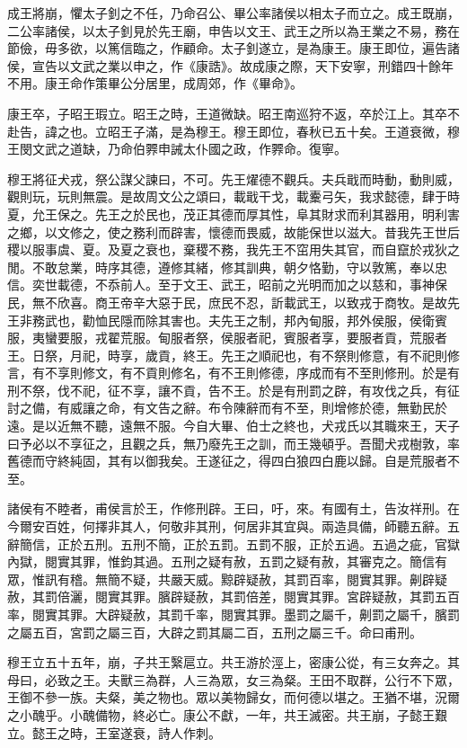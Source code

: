 成王將崩，懼太子釗之不任，乃命召公、畢公率諸侯以相太子而立之。成王既崩，二公率諸侯，以太子釗見於先王廟，申告以文王、武王之所以為王業之不易，務在節儉，毋多欲，以篤信臨之，作顧命。太子釗遂立，是為康王。康王即位，遍告諸侯，宣告以文武之業以申之，作《康誥》。故成康之際，天下安寧，刑錯四十餘年不用。康王命作策畢公分居里，成周郊，作《畢命》。

康王卒，子昭王瑕立。昭王之時，王道微缺。昭王南巡狩不返，卒於江上。其卒不赴告，諱之也。立昭王子滿，是為穆王。穆王即位，春秋已五十矣。王道衰微，穆王閔文武之道缺，乃命伯臩申誡太仆國之政，作臩命。復寧。

穆王將征犬戎，祭公謀父諫曰，不可。先王燿德不觀兵。夫兵戢而時動，動則威，觀則玩，玩則無震。是故周文公之頌曰，載戢干戈，載櫜弓矢，我求懿德，肆于時夏，允王保之。先王之於民也，茂正其德而厚其性，阜其財求而利其器用，明利害之鄉，以文修之，使之務利而辟害，懷德而畏威，故能保世以滋大。昔我先王世后稷以服事虞、夏。及夏之衰也，棄稷不務，我先王不窋用失其官，而自竄於戎狄之閒。不敢怠業，時序其德，遵修其緒，修其訓典，朝夕恪勤，守以敦篤，奉以忠信。奕世載德，不忝前人。至于文王、武王，昭前之光明而加之以慈和，事神保民，無不欣喜。商王帝辛大惡于民，庶民不忍，訢載武王，以致戎于商牧。是故先王非務武也，勸恤民隱而除其害也。夫先王之制，邦內甸服，邦外侯服，侯衛賓服，夷蠻要服，戎翟荒服。甸服者祭，侯服者祀，賓服者享，要服者貢，荒服者王。日祭，月祀，時享，歲貢，終王。先王之順祀也，有不祭則修意，有不祀則修言，有不享則修文，有不貢則修名，有不王則修德，序成而有不至則修刑。於是有刑不祭，伐不祀，征不享，讓不貢，告不王。於是有刑罰之辟，有攻伐之兵，有征討之備，有威讓之命，有文告之辭。布令陳辭而有不至，則增修於德，無勤民於遠。是以近無不聽，遠無不服。今自大畢、伯士之終也，犬戎氏以其職來王，天子曰予必以不享征之，且觀之兵，無乃廢先王之訓，而王幾頓乎。吾聞犬戎樹敦，率舊德而守終純固，其有以御我矣。王遂征之，得四白狼四白鹿以歸。自是荒服者不至。

諸侯有不睦者，甫侯言於王，作修刑辟。王曰，吁，來。有國有土，告汝祥刑。在今爾安百姓，何擇非其人，何敬非其刑，何居非其宜與。兩造具備，師聽五辭。五辭簡信，正於五刑。五刑不簡，正於五罰。五罰不服，正於五過。五過之疵，官獄內獄，閱實其罪，惟鈞其過。五刑之疑有赦，五罰之疑有赦，其審克之。簡信有眾，惟訊有稽。無簡不疑，共嚴天威。黥辟疑赦，其罰百率，閱實其罪。劓辟疑赦，其罰倍灑，閱實其罪。臏辟疑赦，其罰倍差，閱實其罪。宮辟疑赦，其罰五百率，閱實其罪。大辟疑赦，其罰千率，閱實其罪。墨罰之屬千，劓罰之屬千，臏罰之屬五百，宮罰之屬三百，大辟之罰其屬二百，五刑之屬三千。命曰甫刑。

穆王立五十五年，崩，子共王繄扈立。共王游於涇上，密康公從，有三女奔之。其母曰，必致之王。夫獸三為群，人三為眾，女三為粲。王田不取群，公行不下眾，王御不參一族。夫粲，美之物也。眾以美物歸女，而何德以堪之。王猶不堪，況爾之小醜乎。小醜備物，終必亡。康公不獻，一年，共王滅密。共王崩，子懿王艱立。懿王之時，王室遂衰，詩人作刺。

